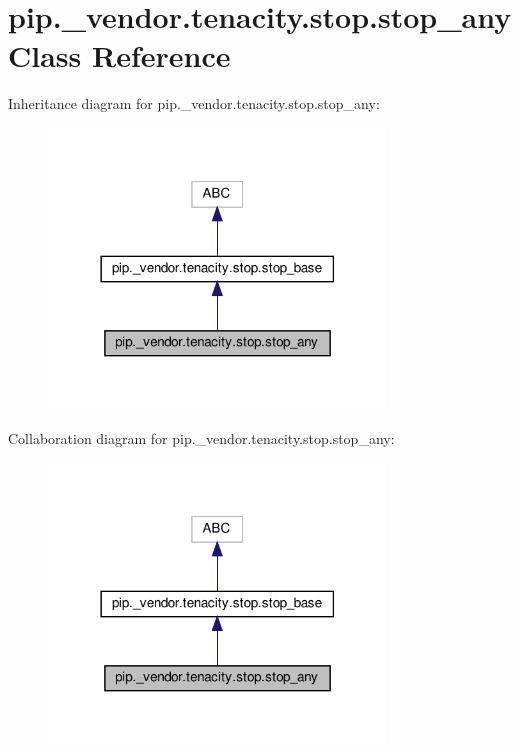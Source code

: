 \hypertarget{classpip_1_1__vendor_1_1tenacity_1_1stop_1_1stop__any}{}\section{pip.\+\_\+vendor.\+tenacity.\+stop.\+stop\+\_\+any Class Reference}
\label{classpip_1_1__vendor_1_1tenacity_1_1stop_1_1stop__any}


Inheritance diagram for pip.\+\_\+vendor.\+tenacity.\+stop.\+stop\+\_\+any\+:
\nopagebreak
\begin{figure}[H]
\begin{center}
\leavevmode
\includegraphics[width=254pt]{classpip_1_1__vendor_1_1tenacity_1_1stop_1_1stop__any__inherit__graph}
\end{center}
\end{figure}


Collaboration diagram for pip.\+\_\+vendor.\+tenacity.\+stop.\+stop\+\_\+any\+:
\nopagebreak
\begin{figure}[H]
\begin{center}
\leavevmode
\includegraphics[width=254pt]{classpip_1_1__vendor_1_1tenacity_1_1stop_1_1stop__any__coll__graph}
\end{center}
\end{figure}
